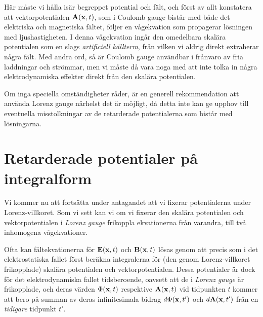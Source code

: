 H{\"a}r m{\aa}ste vi h{\aa}lla is{\"a}r begreppet potential och f{\"a}lt, och
f{\"o}rst av allt konstatera att vektorpotentialen ${\bf A}({\bf x},t)$, som i
Coulomb gauge bist{\aa}r med b{\aa}de det elektriska och magnetiska f{\"a}ltet,
f{\"o}ljer en v{\aa}gekvation som propagerar l{\"o}sningen med ljushastigheten.
I denna v{\aa}gekvation ing{\aa}r den omedelbara skal{\"a}ra potentialen som en
slags {\it artificiell k{\"a}llterm}, fr{\aa}n vilken vi aldrig direkt
extraherar n{\aa}gra f{\"a}lt. Med andra ord, s{\aa} {\"a}r Coulomb gauge
anv{\"a}ndbar i fr{\aa}nvaro av fria laddningar och str{\"o}mmar, men vi
m{\aa}ste d{\aa} vara noga med att inte tolka in n{\aa}gra elektrodynamiska
effekter direkt fr{\aa}n den skal{\"a}ra potentialen.

Om inga speciella omst{\"a}ndigheter r{\aa}der, {\"a}r en generell
rekommendation att anv{\"a}nda Lorenz gauge n{\"a}rhelst det {\"a}r
m{\"o}jligt, d{\aa} detta inte kan ge upphov till eventuella misstolkningar
av de retarderade potentialerna som bist{\aa}r med l{\"o}sningarna.
\vfill\eject

\section{Retarderade potentialer p{\aa} integralform}
Vi kommer nu att forts{\"a}tta under antagandet att vi fixerar potentialerna
under Lorenz-villkoret. Som vi sett kan vi om vi fixerar den skal{\"a}ra
potentialen och vektorpotentialen i {\it Lorenz gauge} frikoppla ekvationerna
fr{\aa}n varandra, till tv{\aa} inhomogena v{\aa}gekvationer.

Ofta kan f{\"a}ltekvationerna f{\"o}r ${\bf E}({\bf x},t)$ och
${\bf B}({\bf x},t)$ l{\"o}sas genom att precis som i det elektrostatiska
fallet f{\"o}rst ber{\"a}kna integralerna f{\"o}r (den genom Lorenz-villkoret
frikopplade) skal{\"a}ra potentialen och vektorpotentialen. Dessa potentialer
{\"a}r dock f{\"o}r det elektrodynamiska fallet tidsberoende, oavsett att de i
{\it Lorenz gauge} {\"a}r frikopplade, och deras v{\"a}rden $\Phi({\bf x},t)$
respektive ${\bf A}({\bf x},t)$ vid tidpunkten $t$ kommer att bero p{\aa}
summan av deras infinitesimala bidrag $d\Phi({\bf x},t')$ och
$d{\bf A}({\bf x},t')$ fr{\aa}n en {\it tidigare} tidpunkt $t'$.

